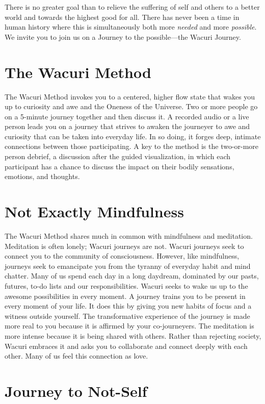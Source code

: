 \documentclass[12pt]{book}
\begin{document}
There is no greater goal than to relieve the suffering of self and
others to a better world and towards the highest good for all. There
has never been a time in human history where this is simultaneously
both more  {\em needed} and more {\em possible}. We invite you to join us on a
Journey to the possible---the Wacuri Journey.


\section{The Wacuri Method}

The Wacuri Method invokes you to a centered, higher flow state that
wakes you up to curiosity and awe and the Oneness of the Universe. Two
or more people go on a 5-minute journey together and then discuss
it. A recorded audio or a live person leads you on a journey that
strives to awaken the journeyer to awe and curiosity that can be taken
into everyday life. In so doing, it forges deep, intimate connections
between those participating. A key to the method is the two-or-more
person debrief, a discussion after the guided visualization, in which
each participant has a chance to discuss the impact on their bodily
sensations, emotions, and thoughts.


\section{Not Exactly Mindfulness}

The Wacuri Method shares much in common with mindfulness and
meditation\cite{siegel2007mindful}. Meditation is often lonely; Wacuri journeys are
not. Wacuri journeys seek to connect you to the community of
consciousness. However, like mindfulness, journeys seek to emancipate
you from the tyranny of everyday habit and mind chatter. Many of us
spend each day in a long daydream, dominated by our pasts, futures,
to-do lists and our responsibilities. Wacuri seeks to wake us up to
the awesome possibilities in every moment. A journey trains you to be
present in every moment of your life. It does this by giving you new
habits of focus and a witness outside yourself. The transformative
experience of the journey is made more real to you because it is
affirmed by your co-journeyers. The meditation is more intense because
it is being shared with others. Rather than rejecting society, Wacuri
embraces it and asks you to collaborate and connect deeply with each
other.  Many of us feel this connection as love.

\section{Journey to Not-Self}
\end{document}
